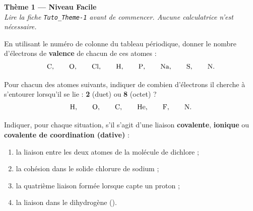 \documentclass[11pt,a4paper]{article}
\begin{document}
\begin{center}
{\Large\bfseries\color{primarydark}Thème 1 — Niveau Facile}\\[2pt]
{\small\itshape Lire la fiche \texttt{Tuto\_Theme-1} avant de commencer. Aucune calculatrice n'est nécessaire.}
\end{center}
\medskip

\begin{exo}
En utilisant le numéro de colonne du tableau périodique, donner le nombre d'électrons de
\textbf{valence} de chacun de ces atomes :
\[ \ce{C}, \qquad \ce{O}, \qquad \ce{Cl}, \qquad \ce{H}, \qquad \ce{P}, \qquad \ce{Na}, \qquad \ce{S}, \qquad \ce{N}. \]
\end{exo}

\begin{exo}
Pour chacun des atomes suivants, indiquer de combien d'électrons il cherche à s'entourer lorsqu'il
se lie : \textbf{2} (duet) ou \textbf{8} (octet) ?
\[ \ce{H}, \qquad \ce{O}, \qquad \ce{C}, \qquad \ce{He}, \qquad \ce{F}, \qquad \ce{N}. \]
\end{exo}

\begin{exo}
Indiquer, pour chaque situation, s'il s'agit d'une liaison \textbf{covalente}, \textbf{ionique}
ou \textbf{covalente de coordination (dative)} :
\begin{enumerate}[label=\alph*),leftmargin=2em,itemsep=1pt]
  \item la liaison entre les deux atomes de la molécule de dichlore  ;
  \item la cohésion dans le solide chlorure de sodium  ;
  \item la quatrième liaison  formée lorsque  capte un proton  ;
  \item la liaison dans le dihydrogène  ().
\end{enumerate}
\end{exo}
\end{document}
